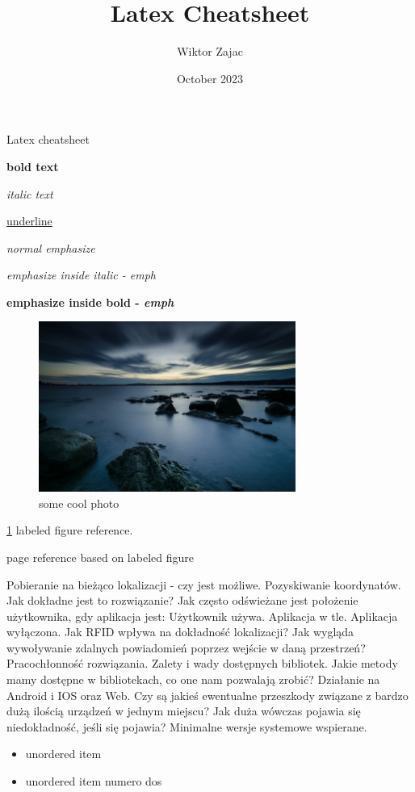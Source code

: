 \documentclass[12pt, a4paper]{article} %
\title{Latex Cheatsheet}
\author{Wiktor Zajac}
\date{October 2023}
\begin{document}
 

\maketitle Latex cheatsheet 
\vspace{5mm}

\textbf{bold text} 

\textit{italic text} 

\underline{underline} 

\emph{normal emphasize}

\textit{emphasize inside italic - \emph{emph}} 

\textbf{emphasize inside bold - \emph{emph}} 


\begin{figure}[h]
	\centering
	\includegraphics[width=0.75\textwidth]{image}
	\caption{some cool photo}
	\label{fig:image}
\end{figure}


\ref{fig:image} labeled figure reference.

\pageref{fig:image} page reference based on labeled figure

Pobieranie na bieżąco lokalizacji - czy jest możliwe. Pozyskiwanie koordynatów. 
Jak dokładne jest to rozwiązanie?
Jak często odświeżane jest położenie użytkownika, gdy aplikacja jest:
Użytkownik używa.
Aplikacja w tle.
Aplikacja wyłączona. 
Jak RFID wpływa na dokładność lokalizacji?
Jak wygląda wywoływanie zdalnych powiadomień poprzez wejście w daną przestrzeń?
Pracochłonność rozwiązania. 
Zalety i wady dostępnych bibliotek. 
Jakie metody mamy dostępne w bibliotekach, co one nam pozwalają zrobić?
Działanie na Android i IOS oraz Web.
Czy są jakieś ewentualne przeszkody związane z bardzo dużą ilością urządzeń w jednym miejscu? Jak duża wówczas pojawia się niedokładność, jeśli się pojawia?
Minimalne wersje systemowe wspierane. 
\begin{itemize}
	\item unordered item
	\item unordered item numero dos
\end{itemize}
\end{document}
